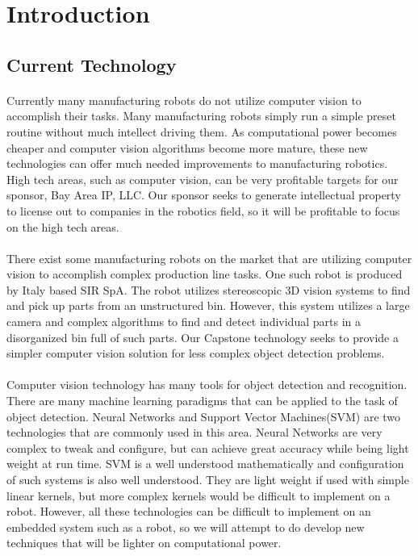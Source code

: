 \documentclass{article}
\begin{document}
\section{Introduction}
\subsection{Current Technology}
\paragraph{}
Currently many manufacturing robots do not utilize computer vision to
accomplish their tasks. Many manufacturing robots simply run a simple preset
routine without much intellect driving them. As computational power becomes
cheaper and computer vision algorithms become more mature, these new
technologies can offer much needed improvements to manufacturing robotics. High
tech areas, such as computer vision, can be very profitable targets for our
sponsor, Bay Area IP, LLC. Our sponsor seeks to generate intellectual property
to license out to companies in the robotics field, so it will be profitable to
focus on the high tech areas. 

\paragraph{} There exist some manufacturing robots on the market that are
utilizing computer vision to accomplish complex production line tasks. One such
robot is produced by Italy based SIR SpA. The robot utilizes stereoscopic 3D
vision systems to find and pick up parts from an unstructured bin. However,
this system utilizes a large camera and complex algorithms to find and detect
individual parts in a disorganized bin full of such parts\cite{SIRfuture}. Our
Capstone technology seeks to provide a simpler computer vision solution for
less complex object detection problems.

\paragraph{} Computer vision technology has many tools for object detection and
recognition.  There are many machine learning paradigms that can be applied to
the task of object detection. Neural Networks and Support Vector Machines(SVM)
are two technologies that are commonly used in this area. Neural Networks are
very complex to tweak and configure, but can achieve great accuracy while being
light weight at run time. SVM is a well understood mathematically and
configuration of such systems is also well understood. They are light weight if
used with simple linear kernels, but more complex kernels would be difficult to
implement on a robot\cite{SVMStackOverflow}. However, all these technologies
can be difficult to implement on an embedded system such as a robot, so we will
attempt to do develop new techniques that will be lighter on computational
power.
\end{document}
